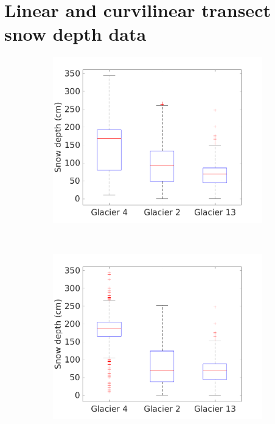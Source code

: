 \documentclass[12pt]{article}
\begin{document}
\pagebreak

\section{Linear and curvilinear transect snow depth data}

\begin{figure}[H]
    \centering
    \begin{subfigure}[b]{0.48\textwidth}
        \includegraphics[width=\textwidth]{box_depth_wZZ.png}
        \caption{ }
        \label{fig:box_depth_wZZ}
    \end{subfigure}
    ~
    \begin{subfigure}[b]{0.48\textwidth}
        \includegraphics[width=\textwidth]{box_depth_noZZ.png}
        \caption{}
        \label{fig:box_depth_noZZ}
    \end{subfigure}


\end{figure}
\end{document}
